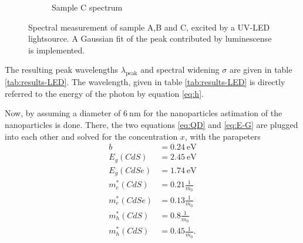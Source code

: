 \begin{figure}
\begin{subfigure}{.32\textwidth}
  \caption{Sample C spectrum}
    \label{fig:Samp_C_D}
\end{subfigure}
\caption{Spectral measurement of sample A,B and C, excited by a UV-LED lightsource. A Gaussian fit of the peak contributed by luminescense is implemented.}
\end{figure}

The resulting peak wavelengths $\lambda_\text{peak}$ and spectral widening $\sigma$ are given in table \ref{tab:results-LED}.
The wavelength, given in table \ref{tab:results-LED} is directly referred to the energy of the photon by equation \ref{eq:h}.

Now, by assuming a diameter of $\SI{6}{\nano\meter}$ for the nanoparticles astimation of the nanoparticles is done.
There, the two equations \ref{eq:QD} and \ref{eq:E-G} are plugged into each other and solved for the concentration $x$, with the parapeters
\begin{align*}
    b          &= \SI{0.24}{\eV}\\
    E_g(CdS)   &= \SI{2.45}{\eV}\\
    E_g(CdSe)  &= \SI{1.74}{\eV}\\
    m^*_e(CdS) &= \num{0.21}\frac{1}{m_0}\\
    m^*_e(CdSe)&= \num{0.13}\frac{1}{m_0}\\
    m^*_h(CdS) &= \num{0.8}\frac{1}{m_0}\\
    m^*_h(CdS) &= \num{0.45}\frac{1}{m_0}.\\
\end{align*}\cite{instruction}

